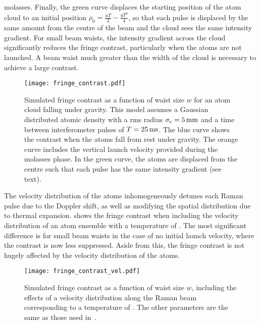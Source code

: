 molasses. Finally, the green curve displaces the starting position of
the atom cloud to an initial position $\rho_0 = \frac{u T}{2} - \frac{g
T^2}{4}$, so that each pulse is displaced by the same amount from the
centre of the beam and the cloud sees the same intensity gradient. For small beam waists, the intensity
gradient across the cloud significantly reduces the fringe contrast,
particularly when the atoms are not launched. A beam waist much greater than the width of the cloud is necessary to achieve a
large contrast. 
\begin{figure}[!htbp]
	\centering
	\texttt{[image: fringe\_contrast.pdf]}
	\caption[Simulated fringe contrast vs beam waist size]{Simulated fringe
		contrast as a function of waist size \(w\) for an atom cloud falling under
		gravity. This model assumes a Gaussian distributed atomic density
    with a rms radius \(\sigma_c = \sivalue{5}{\milli\metre}\) and a time between
		interferometer pulses of \(T = \sivalue{25}{\milli\second}\). The
    blue curve shows the contrast when the atoms fall from rest under gravity.
    The orange curve includes the vertical launch velocity provided
    during the molasses phase. In the green curve, the atoms are
    displaced from the centre such that each pulse has the same
  intensity gradient (see text).} 
	\label{fig:raman_fringecontrast}
\end{figure}
\par\noindent
The velocity distribution of the atoms inhomogeneously detunes each
Raman pulse due to the Doppler shift, as well as modifying
the spatial distribution due to thermal expansion.
 shows the fringe contrast when including the
velocity distribution of an atom ensemble with a
temperature of . The most significant difference is
for small beam waists in
the case of no initial launch velocity, where the contrast is now less
suppressed. Aside from this, the fringe contrast is not hugely
affected by the velocity distribution of the atoms. 
\begin{figure}[htpb]
  \centering
  \texttt{[image: fringe\_contrast\_vel.pdf]}
  \caption[Simulated fringe contrast vs beam waist size including a
  thermal velocity distribution.]{Simulated fringe contrast as a function of waist size $w$,
  including the effects of a velocity distribution along the Raman
beam corresponding to a temperature of . The other
parameters are the same as those used
in~.}
  \label{fig:phase_vel}
\end{figure}
